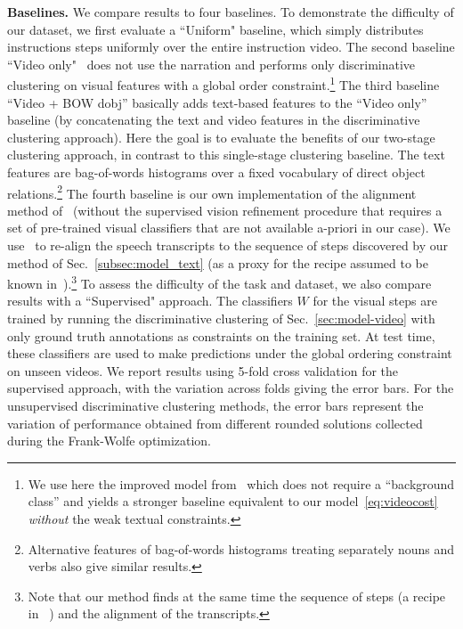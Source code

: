 \documentclass[10pt,twocolumn,letterpaper]{article}
\begin{document}
\textbf{Baselines.} 
We compare results to four baselines. 
To demonstrate the difficulty of our dataset, we first evaluate a ``Uniform" baseline, which simply distributes instructions steps uniformly over the entire instruction video.
The second baseline ``Video only"~\cite{Bojanowski14weakly} does not use the narration and performs only discriminative clustering on visual features with a global order constraint.\footnote{We use here the improved model from~\cite{Bojanowski15weakly} which does not require a ``background class'' and yields a stronger baseline equivalent to our model~\eqref{eq:videocost} \emph{without} the weak textual constraints.}
%
The third baseline ``Video + BOW dobj'' basically adds text-based features to the ``Video only'' baseline (by concatenating the text and video features in the discriminative clustering approach).
Here the goal is to evaluate the benefits of our two-stage clustering approach, in contrast to this single-stage clustering baseline. 
The text features are bag-of-words histograms over a fixed vocabulary of direct object relations.\footnote{Alternative features of bag-of-words histograms treating separately nouns and verbs also give similar results.}
The fourth baseline is our own implementation of the alignment method of~\cite{Malmaud15what} (without the supervised vision refinement procedure that requires a set of pre-trained visual classifiers that are not available a-priori in our case).
%
%
We use~\cite{Malmaud15what} to re-align the speech transcripts to the sequence of steps discovered by our method of Sec.~\ref{subsec:model_text} (as a proxy for the recipe assumed to be known in~\cite{Malmaud15what}).\footnote{Note that our method finds at the same time the sequence of steps (a recipe in ~\cite{Malmaud15what}) and the alignment of the transcripts.}
To assess the difficulty of the task and dataset, we also compare results with a ``Supervised" approach.
The classifiers $W$ for the visual steps are trained by running the discriminative clustering of Sec.~\ref{sec:model-video} with only ground truth annotations as constraints on the training set.
At test time, these classifiers are used to make predictions under the global ordering constraint on unseen videos.
%
%
We report results using 5-fold cross validation for the supervised approach, with the variation 
across folds giving the error bars. 
For the unsupervised discriminative clustering methods, the error bars represent the variation of performance obtained from different rounded solutions collected during the Frank-Wolfe optimization.
%
\end{document}

